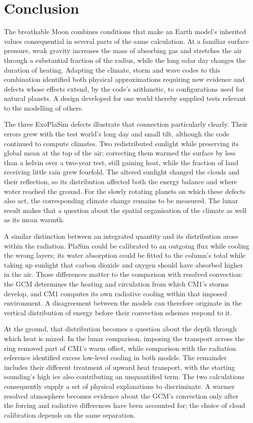 \section{Conclusion}

The breathable Moon combines conditions that make an Earth model's inherited values consequential in several
parts of the same calculation. At a familiar surface pressure, weak gravity increases the mass of absorbing
gas and stretches the air through a substantial fraction of the radius, while the long solar day changes the
duration of heating. Adapting the climate, storm and wave codes to this combination identified both physical
approximations requiring new evidence and defects whose effects extend, by the code's arithmetic, to
configurations used for natural planets. A design developed for one world thereby supplied tests relevant to
the modelling of others.

The three ExoPlaSim defects illustrate that connection particularly clearly. Their errors grew with the test
world's long day and small tilt, although the code continued to compute climates. Two redistributed sunlight
while preserving its global mean at the top of the air; correcting them warmed the surface by less than a
kelvin over a two-year test, still gaining heat, while the fraction of land receiving little rain grew
fourfold. The altered sunlight changed the clouds and their reflection, so its distribution affected both
the energy balance and where water reached the ground. For the slowly rotating planets on which these
defects also act, the corresponding climate change remains to be measured. The lunar result makes that a
question about the spatial organisation of the climate as well as its mean warmth.

A similar distinction between an integrated quantity and its distribution arose within the radiation.
PlaSim could be calibrated to an outgoing flux while cooling the wrong layers; its water absorption could
be fitted to the column's total while taking up sunlight that carbon dioxide and oxygen should have absorbed
higher in the air. Those differences matter to the comparison with resolved convection: the GCM determines
the heating and circulation from which CM1's storms develop, and CM1 computes its own radiative cooling
within that imposed environment. A disagreement between the models can therefore originate in the vertical
distribution of energy before their convection schemes respond to it.

At the ground, that distribution becomes a question about the depth through which heat is mixed. In the
lunar comparison, imposing the transport across the ring removed part of CM1's warm offset, while comparison
with the radiation reference identified excess low-level cooling in both models. The remainder includes
their different treatment of upward heat transport, with the starting sounding's high ice also contributing
an unquantified term. The two calculations consequently supply a set of physical explanations to
discriminate. A warmer resolved atmosphere becomes evidence about the GCM's convection only after the
forcing and radiative differences have been accounted for; the choice of cloud calibration depends on the
same separation.

